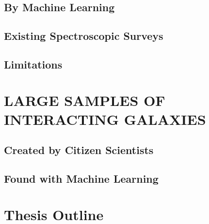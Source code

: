 \subsection{By Machine Learning}
\subsection{Existing Spectroscopic Surveys}
\subsection{Limitations}
\section{LARGE SAMPLES OF INTERACTING GALAXIES}
\subsection{Created by Citizen Scientists}
\subsection{Found with Machine Learning}
\section{Thesis Outline}